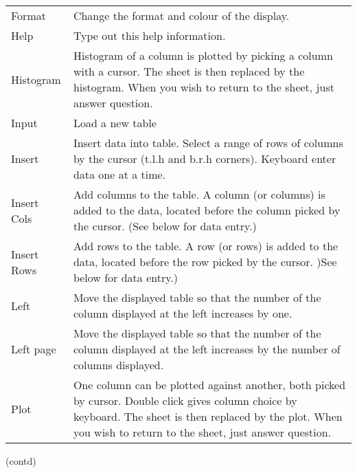 \begin{small}
{{\begin{tabular}{|l|p{4.5in}|}
 Format      &  Change the format and colour of the display. \\
 Help        &  Type out this help information. \\
 Histogram   &  Histogram of a column is plotted by picking a
                column with a cursor. The sheet is then
                replaced by the histogram. When you wish
                to return to the sheet, just answer question. \\
 Input       &  Load a new table \\
 Insert      &  Insert data into table. Select a range of rows
                of columns by the cursor (t.l.h and b.r.h
                corners). Keyboard enter data one at a time. \\
 Insert Cols &  Add columns to the table. A column (or columns)
                is added to the data, located before the
                column picked by the cursor. (See below for
                data entry.) \\
 Insert Rows &  Add rows to the table. A row (or rows)
                is added to the data, located before the
                row picked by the cursor. )See below for
                data entry.) \\
 Left        &  Move the displayed table so that the number
                of the column displayed at the left increases
                by one. \\
 Left page   &  Move the displayed table so that the number
                of the column displayed at the left increases
                by the number of columns displayed. \\
 Plot        &  One column can be plotted against another, both
                picked by cursor. Double click gives column
                choice by keyboard. The sheet is then
                replaced by the plot. When you wish
                to return to the sheet, just answer question. \\
\hline\end{tabular}

\newpage

(contd)

}}
\end{small}
